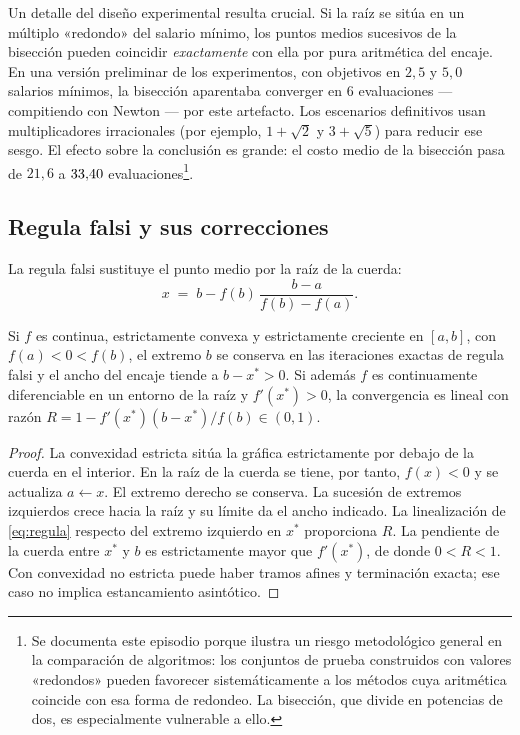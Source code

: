 \begin{remark}
\label{rem:sesgo-diadico}
Un detalle del diseño experimental resulta crucial. Si la raíz se sitúa en un
múltiplo «redondo» del salario mínimo, los puntos medios sucesivos de la bisección
pueden coincidir \emph{exactamente} con ella por pura aritmética del encaje. En una
versión preliminar de los experimentos, con objetivos en $2{,}5$ y $5{,}0$
salarios mínimos, la bisección aparentaba converger en $6$ evaluaciones ---
compitiendo con Newton --- por este artefacto. Los escenarios definitivos usan
multiplicadores irracionales (por ejemplo, $1+\sqrt2$ y $3+\sqrt5$) para
reducir ese sesgo. El efecto sobre la conclusión es grande: el costo medio
de la bisección pasa de $21{,}6$ a $33{,}40$ evaluaciones\footnote{Se documenta este episodio porque ilustra un riesgo metodológico general en la comparación de algoritmos: los conjuntos de prueba construidos con valores «redondos» pueden favorecer sistemáticamente a los métodos cuya aritmética coincide con esa forma de redondeo. La bisección, que divide en potencias de dos, es especialmente vulnerable a ello.}.
\end{remark}

\subsection{Regula falsi y sus correcciones}

La regula falsi sustituye el punto medio por la raíz de la cuerda:
\begin{equation}
\label{eq:regula}
  x \;=\; b - f(b)\,\frac{b-a}{f(b)-f(a)} .
\end{equation}

\begin{proposition}
\label{prop:estancamiento}
Si $f$ es continua, estrictamente convexa y estrictamente creciente en $[a,b]$,
con $f(a)<0<f(b)$, el extremo $b$ se conserva en las iteraciones exactas
de regula falsi y el ancho del encaje tiende a $b-x^*>0$. Si además $f$ es
continuamente diferenciable en un entorno de la raíz y $f'(x^*)>0$, la
convergencia es lineal con razón
$R=1-f'(x^*)(b-x^*)/f(b)\in(0,1)$.
\end{proposition}
\begin{proof}
La convexidad estricta sitúa la gráfica estrictamente por debajo de la
cuerda en el interior. En la raíz de la cuerda se tiene, por tanto,
$f(x)<0$ y se actualiza $a\leftarrow x$. El extremo derecho se conserva.
La sucesión de extremos izquierdos crece hacia la raíz y su límite da
el ancho indicado. La linealización de \cref{eq:regula} respecto del
extremo izquierdo en $x^*$ proporciona $R$. La pendiente de la cuerda
entre $x^*$ y $b$ es estrictamente mayor que $f'(x^*)$, de donde
$0<R<1$. Con convexidad no estricta puede haber tramos afines y
terminación exacta; ese caso no implica estancamiento asintótico.
\end{proof}

